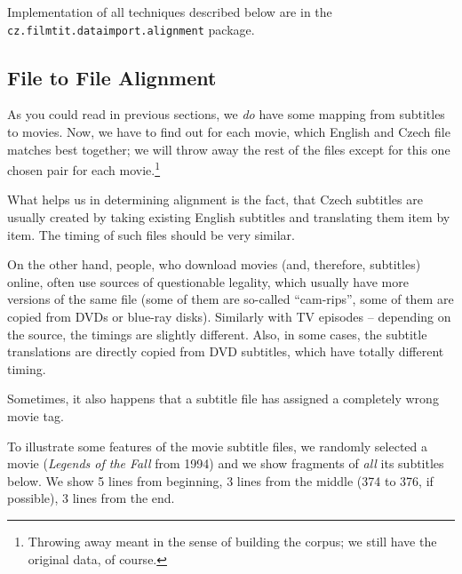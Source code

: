 Implementation of all techniques described below are in the \texttt{cz.filmtit.dataimport.alignment} package.

\subsection{File to File Alignment}

As you could read in previous sections, we \emph{do} have some mapping from subtitles to movies. Now, we have to find out for each movie, which English and Czech file matches best together; we will throw away the rest of the files except for this one chosen pair for each movie.\footnote{Throwing away meant in the sense of building the corpus; we still have the original data, of course.}

What helps us in determining alignment is the fact, that Czech subtitles are usually created by taking existing English subtitles and translating them item by item. The timing of such files should be very similar. 

On the other hand, people, who download movies (and, therefore, subtitles) online, often use sources of questionable legality, which usually have more versions of the same file (some of them are so-called ``cam-rips'', some of them are copied from DVDs or blue-ray disks). Similarly with TV episodes -- depending on the source, the timings are slightly different. Also, in some cases, the subtitle translations are directly copied from DVD subtitles, which have totally different timing.

Sometimes, it also happens that a subtitle file has assigned a completely wrong movie tag.

To illustrate some features of the movie subtitle files, we randomly selected a movie (\emph{Legends of the Fall} from 1994) and we show fragments of \emph{all} its subtitles below. We show 5 lines from beginning, 3 lines from the middle (374 to 376, if possible), 3 lines from the end.

\label{subtitledump}

\newcommand{\nicesubs}[4]{
\noindent
\begin{boxedminipage}{\textwidth}
\begin{minipage}[b]{0.24\textwidth}\footnotesize\smaller[2]{\tt
#1
}\end{minipage}
\begin{minipage}[b]{0.24\textwidth}\footnotesize\smaller[2]{\tt
#2
}\end{minipage}
\begin{minipage}[b]{0.24\textwidth}\footnotesize\smaller[2]{\tt
#3
}\end{minipage}
\begin{minipage}[b]{0.24\textwidth}\footnotesize\smaller[2]{\tt
#4
}\end{minipage}
\end{boxedminipage}
}


